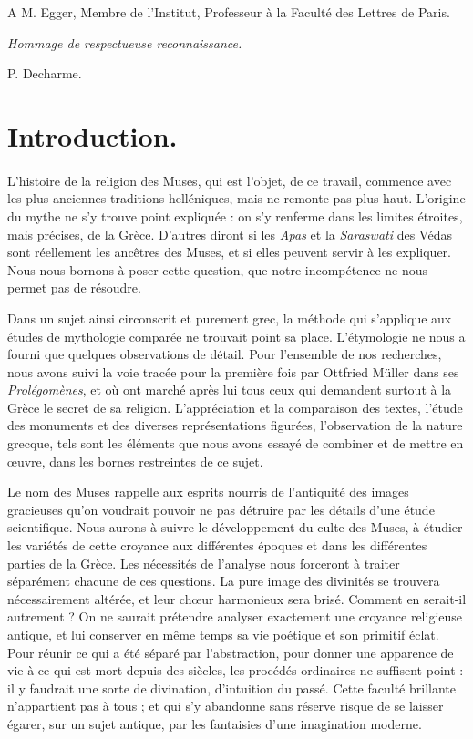 \documentclass[landscape, a4paper, 11pt, oneside, polutonikogreek, french]{article}
\begin{document}
\setlength{\parskip}{1mm plus1mm minus1mm}
\clearpage
\Large
\tableofcontents
\clearpage
\vspace*{\fill}
A M. Egger, Membre de l'Institut, Professeur à la Faculté des Lettres de Paris.

\emph{Hommage de respectueuse reconnaissance.}

\bigskip

P. Decharme.
\vspace*{\fill}
\clearpage
\section*{Introduction.}
\paragraph{}
L'histoire de la religion des Muses, qui est l'objet, de ce travail, commence avec les plus anciennes traditions helléniques, mais ne remonte pas plus haut. L'origine du mythe ne s'y trouve point expliquée : on s'y renferme dans les limites étroites, mais précises, de la Grèce. D'autres diront si les \emph{Apas} et la \emph{Saraswati} des Védas sont réellement les ancêtres des Muses, et si elles peuvent servir à les expliquer. Nous nous bornons à poser cette question, que notre incompétence ne nous permet pas de résoudre.

Dans un sujet ainsi circonscrit et purement grec, la méthode qui s'applique aux études de mythologie comparée ne trouvait point sa place. L'étymologie ne nous a fourni que quelques observations de détail. Pour l'ensemble de nos recherches, nous avons suivi la voie tracée pour la première fois par Ottfried Müller dans ses \emph{Prolégomènes}, et où ont marché après lui tous ceux qui demandent surtout à la Grèce le secret de sa religion. L'appréciation et la comparaison des textes, l'étude des monuments et des diverses représentations figurées, l'observation de la nature grecque, tels sont les éléments que nous avons essayé de combiner et de mettre en œuvre, dans les bornes restreintes de ce sujet.

Le nom des Muses rappelle aux esprits nourris de l'antiquité des images gracieuses qu'on voudrait pouvoir ne pas détruire par les détails d'une étude scientifique. Nous aurons à suivre le développement du culte des Muses, à étudier les variétés de cette croyance aux différentes époques et dans les différentes parties de la Grèce. Les nécessités de l'analyse nous forceront à traiter séparément chacune de ces questions. La pure image des divinités se trouvera nécessairement altérée, et leur chœur harmonieux sera brisé. Comment en serait-il autrement ? On ne saurait prétendre analyser exactement une croyance religieuse antique, et lui conserver en même temps sa vie poétique et son primitif éclat. Pour réunir ce qui a été séparé par l'abstraction, pour donner une apparence de vie à ce qui est mort depuis des siècles, les procédés ordinaires ne suffisent point : il y faudrait une sorte de divination, d'intuition du passé. Cette faculté brillante n'appartient pas à tous ; et qui s'y abandonne sans réserve risque de se laisser égarer, sur un sujet antique, par les fantaisies d'une imagination moderne.
\end{document}
